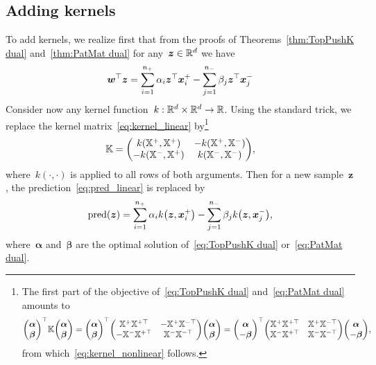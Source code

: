 \subsection{Adding kernels}

To add kernels, we realize first that from the proofs of Theorems~\ref{thm:TopPushK dual} and~\ref{thm:PatMat dual} for any~$\bm{z}\in\mathbb{R}^d$ we have
\begin{equation}\label{eq:pred_linear}
  \bm{w}^\top \bm{z} = \sum_{i = 1}^{n_{+}} \alpha_i \bm{z}^\top \bm{x}^+_i - \sum_{j = 1}^{n_{-}} \beta_j \bm{z}^\top \bm{x}^-_j
\end{equation}
Consider now any kernel function~$k:\mathbb{R}^d\times\mathbb{R}^d\to\mathbb{R}$. Using the standard trick, we replace the kernel matrix~\eqref{eq:kernel_linear} by\footnote{
The first part of the objective of~\eqref{eq:TopPushK dual} and~\eqref{eq:PatMat dual} amounts to
\begin{equation*}
  \Matrix{\bm{\alpha} \\ \bm{\beta}}^\top \K \Matrix{\bm{\alpha} \\ \bm{\beta}}
  = \Matrix{\bm{\alpha} \\ \bm{\beta}}^\top \Matrix{\X^+ \X^{+\top} & -\X^+ \X^{-\top} \\ -\X^- \X^{+\top} & \X^- \X^{-\top} }\Matrix{\bm{\alpha} \\ \bm{\beta}}
  = \Matrix{\bm{\alpha} \\ -\bm{\beta}}^\top \Matrix{\X^+ \X^{+\top} & \X^+ \X^{-\top} \\ \X^- \X^{+\top} & \X^- \X^{-\top} }\Matrix{\bm{\alpha} \\ -\bm{\beta}},
\end{equation*}
from which~\eqref{eq:kernel_nonlinear} follows.}
\begin{equation}\label{eq:kernel_nonlinear}
  \K = \Matrix{k(\X^+, \X^{+}) & -k(\X^+, \X^{-}) \\ -k(\X^-, \X^{+}) & k(\X^-, \X^{-}) },
\end{equation}
where~$k(\cdot,\cdot)$ is applied to all rows of both arguments. Then for a new sample~$\bm{z}$, the prediction~\eqref{eq:pred_linear} is replaced by
\begin{equation}\label{eq:pred_nonlinear}
  \textrm{pred}(\bm{z}) = \sum_{i = 1}^{\npos} \alpha_i k\left(\bm{z}, \bm{x}^+_i\right) - \sum_{j = 1}^{\nneg} \beta_j k\left(\bm{z}, \bm{x}^-_j\right),
\end{equation}
where~$\bm{\alpha}$ and~$\bm{\beta}$ are the optimal solution of~\eqref{eq:TopPushK dual} or~\eqref{eq:PatMat dual}.


